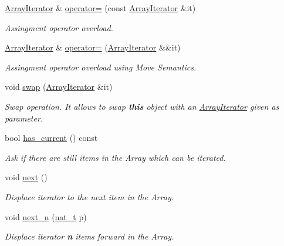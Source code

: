 \begin{DoxyCompactItemize}
\hyperlink{class_designar_1_1_array_iterator}{Array\+Iterator} \& \hyperlink{class_designar_1_1_array_iterator_a26d812ac595156aed963e60d41d91fa7}{operator=} (const \hyperlink{class_designar_1_1_array_iterator}{Array\+Iterator} \&it)
\begin{DoxyCompactList}\small\item\em Assingment operator overload. \end{DoxyCompactList}\item 
\hyperlink{class_designar_1_1_array_iterator}{Array\+Iterator} \& \hyperlink{class_designar_1_1_array_iterator_a219eb8e4d831f490cf9cdcb1f60dcacc}{operator=} (\hyperlink{class_designar_1_1_array_iterator}{Array\+Iterator} \&\&it)
\begin{DoxyCompactList}\small\item\em Assingment operator overload using Move Semantics. \end{DoxyCompactList}\item 
void \hyperlink{class_designar_1_1_array_iterator_a6c3a5bf56a2b7da838ca773368e4699a}{swap} (\hyperlink{class_designar_1_1_array_iterator}{Array\+Iterator} \&it)
\begin{DoxyCompactList}\small\item\em Swap operation. It allows to swap {\bfseries this} object with an \hyperlink{class_designar_1_1_array_iterator}{Array\+Iterator} given as parameter. \end{DoxyCompactList}\item 
bool \hyperlink{class_designar_1_1_array_iterator_aafec192c97299c4f21c28c65e58b19fc}{has\+\_\+current} () const
\begin{DoxyCompactList}\small\item\em Ask if there are still items in the Array which can be iterated. \end{DoxyCompactList}\item 
void \hyperlink{class_designar_1_1_array_iterator_ac4e929d3247b68c3c9cffb43ec0891ec}{next} ()
\begin{DoxyCompactList}\small\item\em Displace iterator to the {\itshape next} item in the Array. \end{DoxyCompactList}\item 
void \hyperlink{class_designar_1_1_array_iterator_a8709128b09b8b177fa1b042cb330c3e5}{next\+\_\+n} (\hyperlink{namespace_designar_aa72662848b9f4815e7bf31a7cf3e33d1}{nat\+\_\+t} p)
\begin{DoxyCompactList}\small\item\em Displace iterator {\bfseries n} items forward in the Array. \end{DoxyCompactList}\item 

\end{DoxyCompactItemize}
